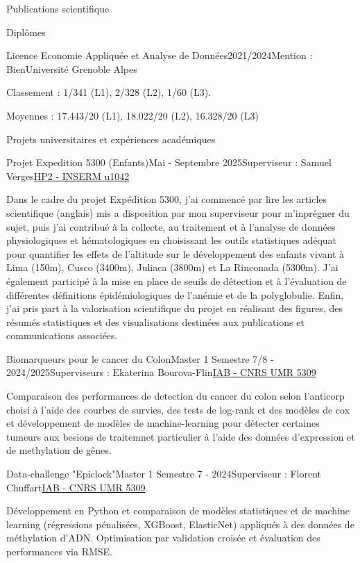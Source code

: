\documentclass[11pt,]{resume}
\begin{document}
\begin{rSection}{Publications scientifique}
\begin{rSection}{Diplômes}
	\begin{rSubsection}{Licence Economie Appliquée et Analyse de Données}{2021/2024}{Mention : Bien}{Université Grenoble Alpes}
		\item Classement : 1/341 (L1), 2/328 (L2), 1/60 (L3).
		\item Moyennes : 17.443/20 (L1), 18.022/20 (L2), 16.328/20 (L3)
	\end{rSubsection}

\end{rSection}

\begin{rSection}{Projets universitaires et expériences académiques}

	\begin{rSubsection}{Projet Expedition 5300 (Enfants)}{Mai - Septembre 2025}{Superviseur : Samuel Verges}{\href{https://hp2.univ-grenoble-alpes.fr/fr}{HP2 - INSERM u1042}}
		\item Dans le cadre du projet Expédition 5300, j’ai commencé par lire les articles scientifique (anglais) mis a disposition par mon superviseur pour m'inprégner du sujet, puis j'ai contribué à la collecte, au traitement et à l’analyse de données physiologiques et hématologiques en choisissant les outils statistiques adéquat pour quantifier les effets de l’altitude sur le développement des enfants vivant à Lima (150m), Cusco (3400m), Juliaca (3800m) et La Rinconada (5300m). J’ai également participé à la mise en place de seuils de détection et à l’évaluation de différentes définitions épidémiologiques de l'anémie et de la polyglobulie. Enfin, j’ai pris part à la valorisation scientifique du projet en réalisant des figures, des résumés statistiques et des visualisations destinées aux publications et communications associées.
	\end{rSubsection}
\newpage
	\begin{rSubsection}{Biomarqueurs pour le cancer du Colon}{Master 1 Semestre 7/8 - 2024/2025}{Superviseurs : Ekaterina Bourova-Flin}{\href{https://iab-grenoble.fr/}{IAB - CNRS UMR 5309}}
		\item Comparaison des performances de detection du cancer du colon selon l'anticorp choisi à l'aide des courbes de survies, des tests de log-rank et des modèles de cox et développement de modèles de machine-learning pour détecter certaines tumeurs aux besions de traitemnet particulier à l'aide des données d'expression et de methylation de gênes.
	\end{rSubsection}

	\begin{rSubsection}{Data-challenge "Epiclock"}{Master 1 Semestre 7 - 2024}{Superviseur : Florent Chuffart}{\href{https://iab-grenoble.fr/}{IAB - CNRS UMR 5309}}
		\item Développement en Python et comparaison de modèles statistiques et de machine learning (régressions pénalisées, XGBoost, ElasticNet) appliqués à des données de méthylation d’ADN. Optimisation par validation croisée et évaluation des performances via RMSE.
	\end{rSubsection}


\end{rSection}
\end{rSection}
\end{document}
